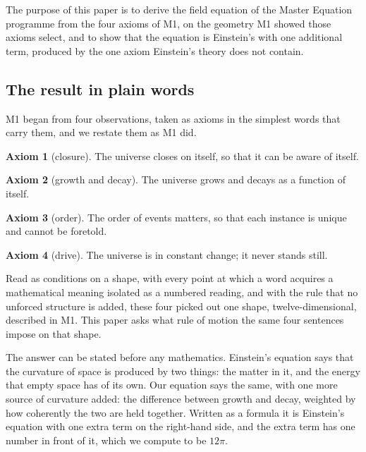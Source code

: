 \documentclass[11pt,a4paper]{article}
\theoremstyle{plain}
\theoremstyle{definition}
\newtheorem{axiom}{Axiom}
\theoremstyle{remark}
\begin{document}
The purpose of this paper is to derive the field equation of the Master Equation programme from the four axioms of M1, on the geometry M1 showed those axioms select, and to show that the equation is Einstein's with one additional term, produced by the one axiom Einstein's theory does not contain.

\subsection{The result in plain words}\label{sec:plain}

M1 began from four observations, taken as axioms in the simplest words that carry them, and we restate them as M1 did.

\begin{axiom}[closure]\label{ax:A1}
The universe closes on itself, so that it can be aware of itself.
\end{axiom}

\begin{axiom}[growth and decay]\label{ax:A2}
The universe grows and decays as a function of itself.
\end{axiom}

\begin{axiom}[order]\label{ax:A3}
The order of events matters, so that each instance is unique and cannot be foretold.
\end{axiom}

\begin{axiom}[drive]\label{ax:A4}
The universe is in constant change; it never stands still.
\end{axiom}

Read as conditions on a shape, with every point at which a word acquires a mathematical meaning isolated as a numbered reading, and with the rule that no unforced structure is added, these four picked out one shape, twelve-dimensional, described in M1. This paper asks what rule of motion the same four sentences impose on that shape.

The answer can be stated before any mathematics. Einstein's equation says that the curvature of space is produced by two things: the matter in it, and the energy that empty space has of its own. Our equation says the same, with one more source of curvature added: the difference between growth and decay, weighted by how coherently the two are held together. Written as a formula it is Einstein's equation with one extra term on the right-hand side, and the extra term has one number in front of it, which we compute to be $12\pi$.
\end{document}
